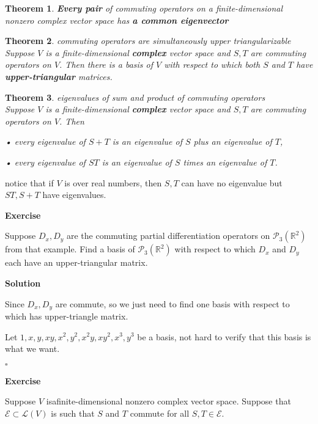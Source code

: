 \documentclass{article}
\newtheorem{theorem}{Theorem}[subsection]
\newenvironment{exercise}{%
{\textbf{Exercise\\}
    }
}{
}
\newenvironment{solution}{%
{
    \textbf{Solution\\}
    }
}{
  \hfill $\square$ 
  \par\bigskip 
}
\newcommand{\RR}{\mathbb{R}}
\begin{document}
\begin{CJK}{UTF8}{gkai}
\begin{theorem}
    \textbf{Every pair} of commuting operators on a finite-dimensional nonzero complex
    vector space has \textbf{a common eigenvector}
\end{theorem}

\begin{theorem}
    commuting operators are simultaneously upper triangularizable\\

    Suppose $V$ is a finite-dimensional \textbf{complex} vector space and $S,T$ are commuting operators on $V$. Then there is a basis of $V$ with respect to which both $S$ and $T$ have \textbf{upper-triangular} matrices.
\end{theorem}

\begin{theorem}
    eigenvalues of sum and product of commuting operators\\

    Suppose $V$ is a finite-dimensional \textbf{complex} vector space and $S,T$ are commuting operators on $V$. Then

    • every eigenvalue of $S + T$ is an eigenvalue of $S$ plus an eigenvalue of $T$,

    • every eigenvalue of $ST$ is an eigenvalue of $S$ times an eigenvalue of $T$.
\end{theorem}

notice that if $V$ is over real numbers, then $S,T$ can have no eigenvalue but $ST,S + T $ have eigenvalues.

\begin{exercise}
    Suppose $D_x,D_y$ are the commuting partial differentiation operators on $\mathcal{P}_3(\RR^2)$ from that example. Find a basis of
    $\mathcal{P}_3(\RR^2)$ with respect to which $D_x$ and $D_y$ each have an upper-triangular matrix.

\end{exercise}

\begin{solution}
    Since $D_x,D_y$ are commute, so we just need to find one basis with respect to which has upper-triangle matrix.

    Let $1,x,y,xy,x^2,y^2,x^2y,xy^2,x^3,y^3$ be a basis, not hard to verify that this basis is what we want.    
\end{solution}

\begin{exercise}
    Suppose $V$ isafinite-dimensional nonzero complex vector space. Suppose that $\mathcal{E} \subset \mathcal{L}(V)$ is such that $S$ and $T$ commute for all $S,T \in \mathcal{E}$.


\end{exercise}
\end{CJK}
\end{document}
